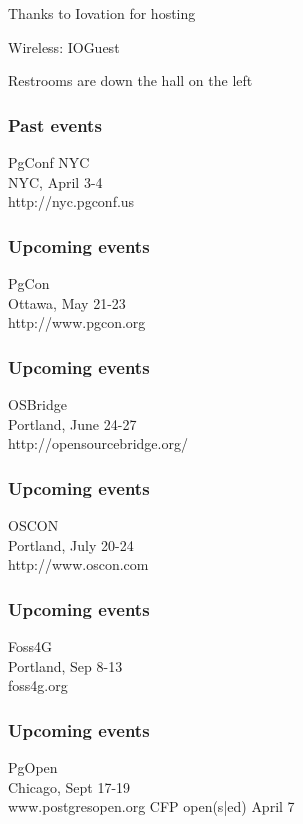\documentclass{beamer}
\begin{document}

\frame
{
  \begin{center}
  \item[]Thanks to Iovation for hosting
  \item[]Wireless: IOGuest
  \item[]Restrooms are down the hall on the left
  \end{center}
}

\frame
{
  \frametitle{Past events}
  \begin{center}
{\large PgConf NYC\\}
NYC, April 3-4\\
http://nyc.pgconf.us
  \end{center}
}

\frame
{
  \frametitle{Upcoming events}
  \begin{center}
{\large PgCon\\}
Ottawa, May 21-23\\
http://www.pgcon.org
  \end{center}
}

\frame
{
  \frametitle{Upcoming events}
  \begin{center}
{\large OSBridge\\}
Portland, June 24-27\\
http://opensourcebridge.org/
  \end{center}
}

\frame
{
  \frametitle{Upcoming events}
  \begin{center}
{\large OSCON\\}
Portland, July 20-24\\
http://www.oscon.com
  \end{center}
}

\frame
{
  \frametitle{Upcoming events}
  \begin{center}
{\large Foss4G\\}
Portland, Sep 8-13\\
foss4g.org
  \end{center}
}

\frame
{
  \frametitle{Upcoming events}
  \begin{center}
{\large PgOpen\\}
Chicago, Sept 17-19\\
www.postgresopen.org
CFP open(s|ed) April 7
  \end{center}
}
\end{document}
